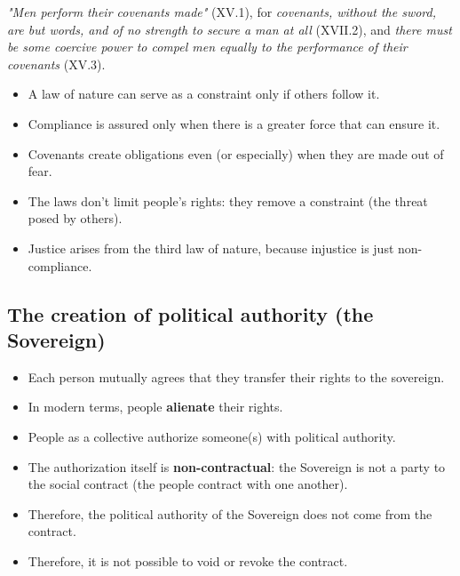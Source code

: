\textit{"Men perform their covenants made"} (XV.1), for \textit{covenants,
without the sword, are but words, and of no strength to secure a man at all}
(XVII.2), and \textit{there must be some coercive power to compel men
equally to the performance of their covenants} (XV.3).

\begin{itemize}
    \item A law of nature can serve as a constraint only if others follow it.
    \item Compliance is assured only when there is a greater force that can
    ensure it.
    \item Covenants create obligations even (or especially) when they are made
    out of fear.
    \item The laws don't limit people's rights: they remove a constraint (the
    threat posed by others).
    \item Justice arises from the third law of nature, because injustice is
    just non-compliance.
\end{itemize}

\subsection{The creation of political authority (the Sovereign)}

\begin{itemize}
    \item Each person mutually agrees that they transfer their rights to
    the sovereign.
    \item In modern terms, people \textbf{alienate} their rights.
    \item People as a collective authorize someone(s) with political
    authority.
    \item The authorization itself is \textbf{non-contractual}: the Sovereign
    is not a party to the social contract (the people contract with one
    another).
    \item Therefore, the political authority of the Sovereign does not come
    from the contract.
    \item Therefore, it is not possible to void or revoke the contract.
\end{itemize}
